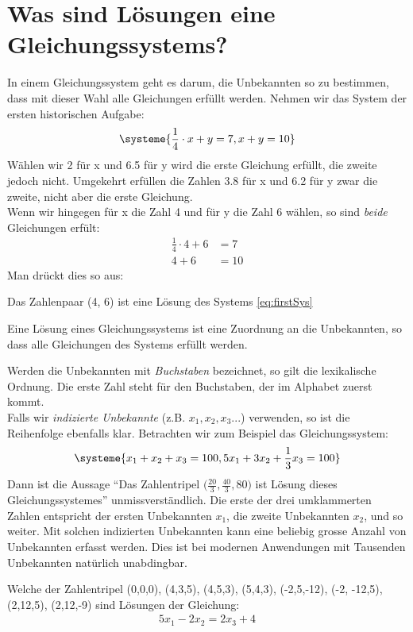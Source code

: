 \documentclass[11pt,oneside]{article}
\begin{document}
\section*{Was sind Lösungen eine Gleichungssystems?}
	In einem Gleichungssystem geht es darum, die Unbekannten so zu bestimmen, dass mit dieser Wahl alle Gleichungen erfüllt werden. Nehmen wir das System der ersten historischen Aufgabe:
	\begin{equation}
		\label{eq:firstSys}
		\systeme{\frac{1}{4}\cdot x+y=7, x+y=10}
	\end{equation}
	Wählen wir 2 für x und 6.5 für y wird die erste Gleichung erfüllt, die zweite jedoch nicht. Umgekehrt erfüllen die Zahlen 3.8 für x und 6.2 für y zwar die zweite, nicht aber die erste Gleichung.\\
	Wenn wir hingegen für x die Zahl 4 und für y die Zahl 6 wählen, so sind \emph{beide} Gleichungen erfült:
	\begin{align*}
		\frac{1}{4}\cdot 4 +6 &= 7\\
		4+6&=10
	\end{align*}
	Man drückt dies so aus:
	\begin{center}\glqq Das Zahlenpaar (4, 6) ist eine Lösung des Systems \ref{eq:firstSys}\grqq\end{center}
	\begin{definition}
		Eine Lösung eines Gleichungssystems ist eine Zuordnung an die Unbekannten, so dass alle Gleichungen des Systems erfüllt werden.
	\end{definition}
	Werden die Unbekannten mit \emph{Buchstaben} bezeichnet, so gilt die lexikalische Ordnung. Die erste Zahl steht für den Buchstaben, der im Alphabet zuerst kommt.\\
	Falls wir \emph{indizierte Unbekannte} (z.B. $x_1, x_2, x_3...$) verwenden, so ist die Reihenfolge ebenfalls klar.
	Betrachten wir zum Beispiel das Gleichungssystem:
	\begin{equation*}
		\systeme{x_1+x_2+x_3=100, 5x_1+3x_2+\frac{1}{3}x_3=100}
	\end{equation*}
	Dann ist die Aussage "`Das Zahlentripel $\big(\frac{20}{3},\frac{40}{3},80\big)$ ist Lösung dieses Gleichungssystemes"' unmissverständlich. Die erste der drei umklammerten Zahlen entspricht der ersten Unbekannten $x_1$, die zweite Unbekannten $x_2$, und so weiter. Mit solchen indizierten Unbekannten kann eine beliebig grosse Anzahl von Unbekannten erfasst werden. Dies ist bei modernen Anwendungen mit Tausenden Unbekannten natürlich unabdingbar.
	\begin{aufgabe}
		Welche der Zahlentripel (0,0,0), (4,3,5), (4,5,3), (5,4,3), (-2,5,-12), (-2, -12,5), (2,12,5), (2,12,-9) sind Lösungen der Gleichung:
		\begin{align*}
			5x_1-2x_2=2x_3+4
		\end{align*}
	\end{aufgabe}
\end{document}
